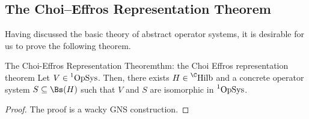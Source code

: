 \documentclass[main.tex]{subfiles}
\begin{document}
\newpage 
\subsection{The Choi--Effros Representation Theorem}
\label{subsec:matrix-ordered-spaces-II}


Having discussed the basic theory of abstract operator systems, it is desirable for us to prove the following theorem. 

\begin{theorem}{The Choi-Effros Representation Theorem}{thm: the Choi Effros representation theorem}
Let $V \in \operatorname{\prescript{1}{}{OpSys}}$. Then, there exists $H \in \Hilb$ and a concrete operator system $S \subseteq \Bs(H)$ such that $V$ and $S$ are isomorphic in $\operatorname{\prescript{1}{}{OpSys}}$. 
\end{theorem}
\begin{proof}
The proof is a wacky GNS construction. 
\end{proof}
\end{document}
